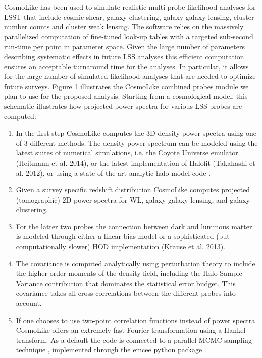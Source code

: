CosmoLike has been used to simulate realistic multi-probe likelihood analyses for LSST \citep{} that include cosmic shear, galaxy clustering, galaxy-galaxy lensing, cluster number counts and cluster weak lensing. 
The software relies on the massively parallelized computation of fine-tuned look-up tables with a targeted sub-second run-time per point in parameter space. Given the large number of parameters describing systematic effects in future LSS analyses this efficient computation ensures an acceptable turnaround time for the analyses. In particular, it allows for the large number of simulated likelihood analyses that are needed to optimize future surveys. Figure 1 illustrates the CosmoLike combined probes module we plan to use for the proposed analysis. Starting from a cosmological model, this schematic illustrates how projected power spectra for various LSS probes are computed: 
\begin{enumerate}
\item In the first step CosmoLike computes the 3D-density power spectra using one of 3 different methods. The density power spectrum can be modeled using the latest suites of numerical simulations, i.e. the Coyote Universe emulator (Heitmann et al. 2014), or the latest implementation of Halofit (Takahashi et al. 2012), or using a state-of-the-art analytic halo model code \citep{Krause2013}. 
\item Given a survey specific redshift distribution CosmoLike computes projected (tomographic) 2D power spectra for WL, galaxy-galaxy lensing, and galaxy clustering.
\item  For the latter two probes the connection between dark and luminous matter is modeled through either a linear bias model or a sophisticated (but computationally slower) HOD implementation (Krause et al. 2013).
\item The covariance is computed analytically using perturbation theory to include the higher-order moments of the density field, including the Halo Sample Variance contribution that dominates the statistical error budget. This covariance takes all cross-correlations between the different probes into account. 
\item If one chooses to use two-point correlation functions instead of power spectra CosmoLike offers an extremely fast Fourier transformation using a Hankel transform. As a default the code is connected to a parallel MCMC sampling technique \citep{Goodman2010}, implemented through the emcee python package \citep{Foreman-Mackey2013}.

\end{enumerate}

